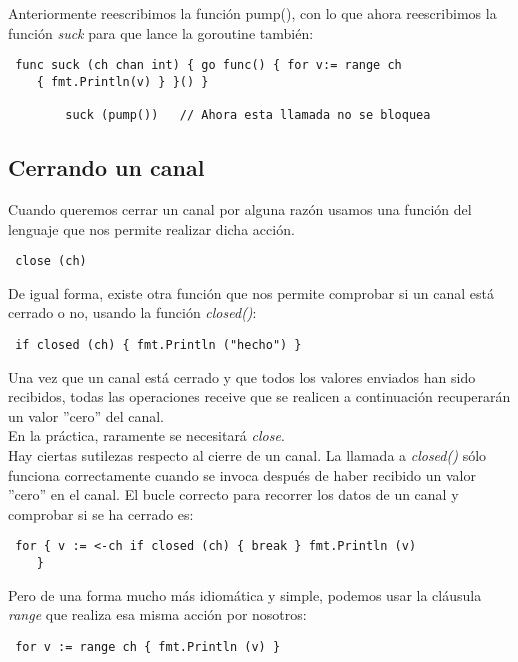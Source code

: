 	Anteriormente reescribimos la función pump(), con lo que ahora reescribimos
	la función \textit{suck} para que lance la goroutine también:
	
	\begin{verbatim} func suck (ch chan int) { go func() { for v:= range ch
	{ fmt.Println(v) } }() }
	   
		suck (pump())   // Ahora esta llamada no se bloquea \end{verbatim}
	
	\subsection{Cerrando un canal}
	
	Cuando queremos cerrar un canal por alguna razón usamos una función del
	lenguaje que nos permite realizar dicha acción.
	
	\begin{verbatim} close (ch) \end{verbatim}
	
	De igual forma, existe otra función que nos permite comprobar si un canal
	está cerrado o no, usando la función \textit{closed()}:
	
	\begin{verbatim} if closed (ch) { fmt.Println ("hecho") } \end{verbatim}
	
	Una vez que un canal está cerrado y que todos los valores enviados han sido
	recibidos, todas las operaciones receive que se realicen a continuación
	recuperarán un valor ''cero'' del canal.\\
	
	En la práctica, raramente se necesitará \textit{close}.\\
	
	Hay ciertas sutilezas respecto al cierre de un canal. La llamada
	a \textit{closed()} sólo funciona correctamente cuando se invoca después de
	haber recibido un valor ''cero'' en el canal. El bucle correcto para
	recorrer los datos de un canal y comprobar si se ha cerrado es:
	
	\begin{verbatim} for { v := <-ch if closed (ch) { break } fmt.Println (v)
	} \end{verbatim}
	
	Pero de una forma mucho más idiomática y simple, podemos usar la cláusula
	\textit{range} que realiza esa misma acción por nosotros:
	
	\begin{verbatim} for v := range ch { fmt.Println (v) } \end{verbatim}
	
